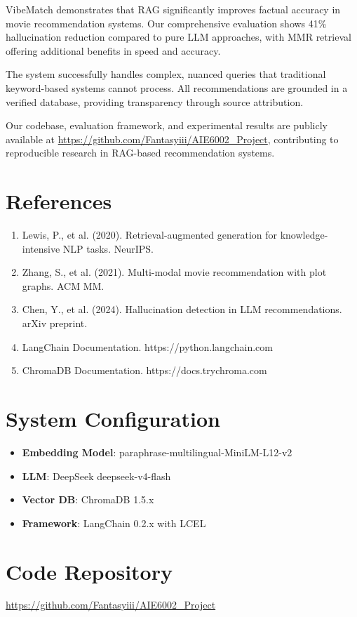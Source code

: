 \documentclass[11pt,a4paper]{article}
\begin{document}
VibeMatch demonstrates that RAG significantly improves factual accuracy in movie recommendation systems. Our comprehensive evaluation shows 41\% hallucination reduction compared to pure LLM approaches, with MMR retrieval offering additional benefits in speed and accuracy.

The system successfully handles complex, nuanced queries that traditional keyword-based systems cannot process. All recommendations are grounded in a verified database, providing transparency through source attribution.

Our codebase, evaluation framework, and experimental results are publicly available at \url{https://github.com/Fantasyiii/AIE6002_Project}, contributing to reproducible research in RAG-based recommendation systems.

\section*{References}

\begin{enumerate}
    \item Lewis, P., et al. (2020). Retrieval-augmented generation for knowledge-intensive NLP tasks. NeurIPS.
    \item Zhang, S., et al. (2021). Multi-modal movie recommendation with plot graphs. ACM MM.
    \item Chen, Y., et al. (2024). Hallucination detection in LLM recommendations. arXiv preprint.
    \item LangChain Documentation. https://python.langchain.com
    \item ChromaDB Documentation. https://docs.trychroma.com
\end{enumerate}

\appendix
\section{System Configuration}

\begin{itemize}
    \item \textbf{Embedding Model}: paraphrase-multilingual-MiniLM-L12-v2
    \item \textbf{LLM}: DeepSeek deepseek-v4-flash
    \item \textbf{Vector DB}: ChromaDB 1.5.x
    \item \textbf{Framework}: LangChain 0.2.x with LCEL
\end{itemize}

\section{Code Repository}

\url{https://github.com/Fantasyiii/AIE6002_Project}
\end{document}

